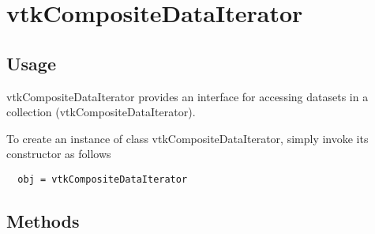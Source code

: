 \section{vtkCompositeDataIterator}

\subsection{Usage}

 vtkCompositeDataIterator provides an interface for accessing datasets
 in a collection (vtkCompositeDataIterator). 

To create an instance of class vtkCompositeDataIterator, simply
invoke its constructor as follows
\begin{verbatim}
  obj = vtkCompositeDataIterator
\end{verbatim}
\subsection{Methods}

